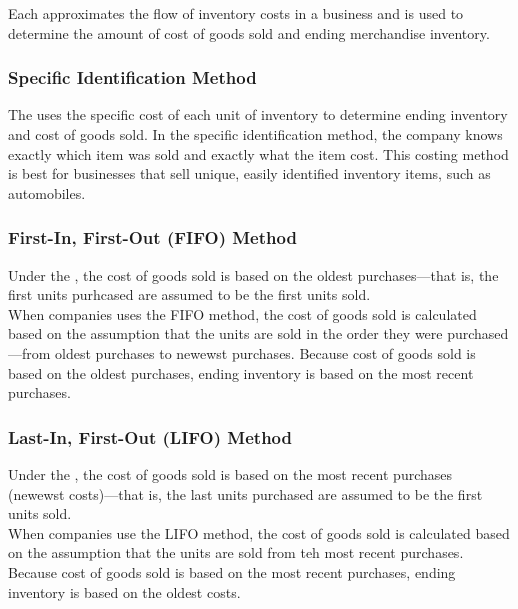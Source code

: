 \documentclass{article}
\begin{document}
Each  approximates the flow of inventory costs in a business and is used to determine the amount of cost of goods sold and ending merchandise inventory.  

\subsubsection{Specific Identification Method} 

The  uses the specific cost of each unit of inventory to determine ending inventory and cost of goods sold. In the specific identification method, the company knows exactly which item was sold and exactly what the item cost. This costing method is best for businesses that sell unique, easily identified inventory items, such as automobiles. 

\subsubsection{First-In, First-Out (FIFO) Method}

Under the , the cost of goods sold is based on the oldest purchases---that is, the first units purhcased are assumed to be the first units sold. \\ 

When companies uses the FIFO method, the cost of goods sold is calculated based on the assumption that the units are sold in the order they were purchased---from oldest purchases to newewst purchases. Because cost of goods sold is based on the oldest purchases, ending inventory is based on the most recent purchases. 

\subsubsection{Last-In, First-Out (LIFO) Method}

Under the , the cost of goods sold is based on the most recent purchases (newewst costs)---that is, the last units purchased are assumed to be the first units sold. \\ 

When companies use the LIFO method, the cost of goods sold is calculated based on the assumption that the units are sold from teh most recent purchases. Because cost of goods sold is based on the most recent purchases, ending inventory is based on the oldest costs. 
\end{document}
